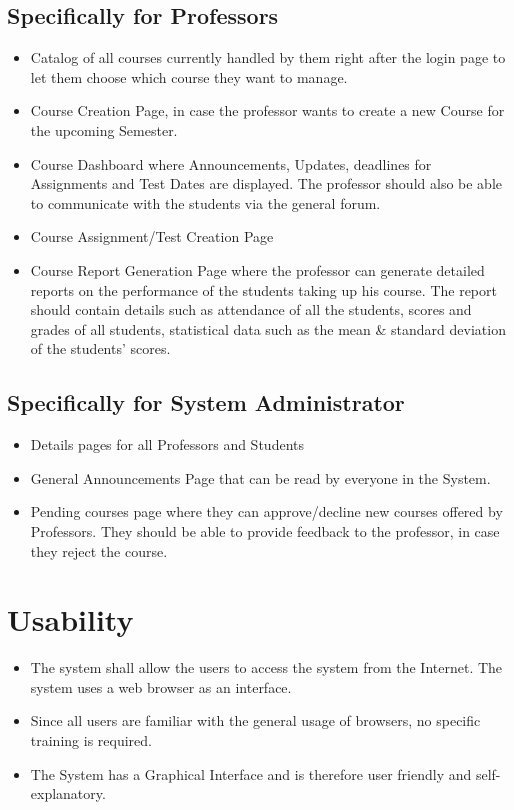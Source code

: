 \documentclass[12pt, a4]{report}
\begin{document}
\subsection{Specifically for Professors}
\begin{itemize}
    \item Catalog of all courses currently handled by them right after the login page to let them choose which course they want to manage.
    \item Course Creation Page, in case the professor wants to create a new Course for the upcoming Semester.
    \item Course Dashboard where Announcements, Updates, deadlines for Assignments and Test Dates are displayed. The professor should also be able to communicate with the students via the general forum.
    \item Course Assignment/Test Creation Page
    \item Course Report Generation Page where the professor can generate detailed reports on the performance of the students taking up his course. The report should contain details such as attendance of all the students, scores and grades of all students, statistical data such as the mean \& standard deviation of the students' scores.
\end{itemize}

\subsection{Specifically for System Administrator}
\begin{itemize}
    \item Details pages for all Professors and Students
    \item General Announcements Page that can be read by everyone in the System.
    \item Pending courses page where they can approve/decline new courses offered by Professors. They should be able to provide feedback to the professor, in case they reject the course.
\end{itemize}


\section{Usability}
\begin{itemize}
    \item The system shall allow the users to access the system from the Internet. The system uses a web browser as an interface.
    \item Since all users are familiar with the general usage of browsers, no specific training is required.
    \item The System has a Graphical Interface and is therefore user friendly and self-explanatory.
\end{itemize}
\end{document}
